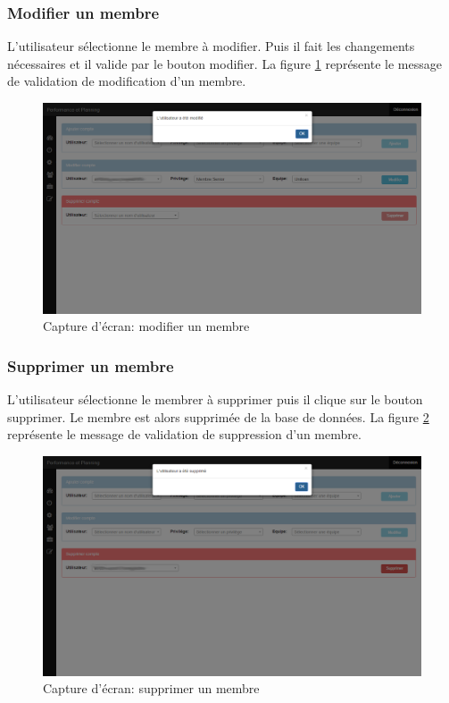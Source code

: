 \subsubsection{Modifier un membre}
L'utilisateur sélectionne le membre à modifier. Puis il fait les changements nécessaires et il valide par le bouton modifier. La figure \ref{code89} représente le message de validation de modification d'un membre.
\begin{figure}[H]
  \centering
 \includegraphics[scale=0.37]{figures/printscreen_app/6_3.PNG}
 \caption{Capture d'écran: modifier un membre}
 \label{code89}
\end{figure}

\subsubsection{Supprimer un membre}
L'utilisateur sélectionne le membrer à supprimer puis il clique sur le bouton supprimer. Le membre est alors supprimée de la base de données. La figure \ref{code90} représente le message de validation de suppression d'un membre.
\begin{figure}[H]
  \centering
 \includegraphics[scale=0.37]{figures/printscreen_app/7_3.PNG}
 \caption{Capture d'écran: supprimer un membre}
 \label{code90}
\end{figure}

